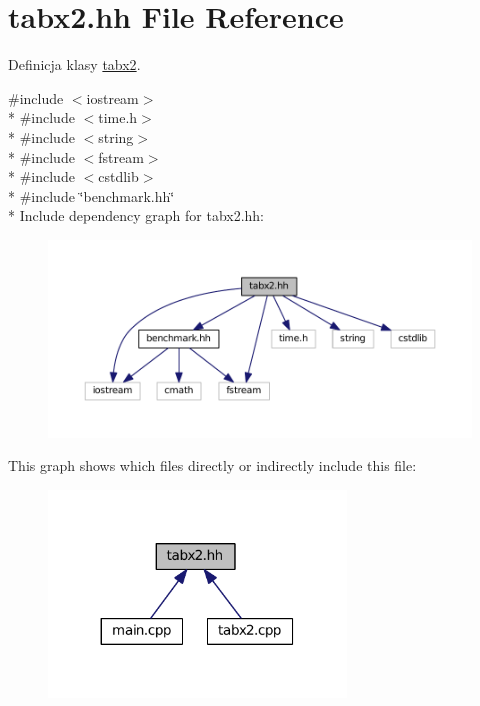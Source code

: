 \hypertarget{tabx2_8hh}{}\section{tabx2.\+hh File Reference}
\label{tabx2_8hh}


Definicja klasy \hyperlink{classtabx2}{tabx2}.  


{\ttfamily \#include $<$iostream$>$}\\*
{\ttfamily \#include $<$time.\+h$>$}\\*
{\ttfamily \#include $<$string$>$}\\*
{\ttfamily \#include $<$fstream$>$}\\*
{\ttfamily \#include $<$cstdlib$>$}\\*
{\ttfamily \#include \char`\"{}benchmark.\+hh\char`\"{}}\\*
Include dependency graph for tabx2.\+hh\+:\nopagebreak
\begin{figure}[H]
\begin{center}
\leavevmode
\includegraphics[width=350pt]{d9/d1c/tabx2_8hh__incl}
\end{center}
\end{figure}
This graph shows which files directly or indirectly include this file\+:\nopagebreak
\begin{figure}[H]
\begin{center}
\leavevmode
\includegraphics[width=224pt]{d0/db4/tabx2_8hh__dep__incl}
\end{center}
\end{figure}
